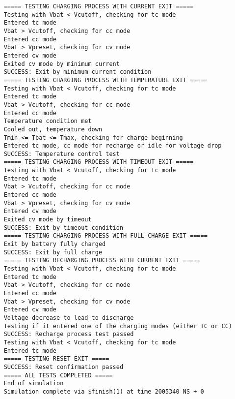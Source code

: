 \documentclass[12pt]{article}
\begin{document}
\begin{tcolorbox}[title=New Controller Self-testable Testbench Output Log, colback=gray!5, colframe=black]
    \tiny %
    \begin{verbatim}
    ===== TESTING CHARGING PROCESS WITH CURRENT EXIT =====
    Testing with Vbat < Vcutoff, checking for tc mode
    Entered tc mode
    Vbat > Vcutoff, checking for cc mode
    Entered cc mode
    Vbat > Vpreset, checking for cv mode
    Entered cv mode
    Exited cv mode by minimum current
    SUCCESS: Exit by minimum current condition
    ===== TESTING CHARGING PROCESS WITH TEMPERATURE EXIT =====
    Testing with Vbat < Vcutoff, checking for tc mode
    Entered tc mode
    Vbat > Vcutoff, checking for cc mode
    Entered cc mode
    Temperature condition met
    Cooled out, temperature down
    Tmin <= Tbat <= Tmax, checking for charge beginning
    Entered tc mode, cc mode for recharge or idle for voltage drop
    SUCCESS: Temperature control test
    ===== TESTING CHARGING PROCESS WITH TIMEOUT EXIT =====
    Testing with Vbat < Vcutoff, checking for tc mode
    Entered tc mode
    Vbat > Vcutoff, checking for cc mode
    Entered cc mode
    Vbat > Vpreset, checking for cv mode
    Entered cv mode
    Exited cv mode by timeout
    SUCCESS: Exit by timeout condition
    ===== TESTING CHARGING PROCESS WITH FULL CHARGE EXIT =====
    Exit by battery fully charged
    SUCCESS: Exit by full charge
    ===== TESTING RECHARGING PROCESS WITH CURRENT EXIT =====
    Testing with Vbat < Vcutoff, checking for tc mode
    Entered tc mode
    Vbat > Vcutoff, checking for cc mode
    Entered cc mode
    Vbat > Vpreset, checking for cv mode
    Entered cv mode
    Voltage decrease to lead to discharge
    Testing if it entered one of the charging modes (either TC or CC)
    SUCCESS: Recharge process test passed
    Testing with Vbat < Vcutoff, checking for tc mode
    Entered tc mode
    ===== TESTING RESET EXIT =====
    SUCCESS: Reset confirmation passed
    ===== ALL TESTS COMPLETED =====
    End of simulation
    Simulation complete via $finish(1) at time 2005340 NS + 0
    \end{verbatim}
\end{tcolorbox}
\end{document}
